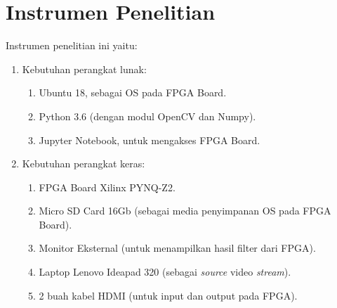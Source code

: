 \section{Instrumen Penelitian}
Instrumen penelitian ini yaitu:
\begin{enumerate}[topsep=0pt,itemsep=0pt,partopsep=0pt, parsep=0pt]
    \item Kebutuhan perangkat lunak:
    \begin{enumerate}[topsep=0pt,itemsep=0pt,partopsep=0pt, parsep=0pt, label={\alph*.}]
        \item Ubuntu 18, sebagai OS pada FPGA Board.
        \item Python 3.6 (dengan modul OpenCV dan Numpy).
        \item Jupyter Notebook, untuk mengakses FPGA Board. 
    \end{enumerate}
    \item Kebutuhan perangkat keras:
    \begin{enumerate}[topsep=0pt,itemsep=0pt,partopsep=0pt, parsep=0pt, label={\alph*.}]
        \item FPGA Board Xilinx PYNQ-Z2.
        \item Micro SD Card 16Gb (sebagai media penyimpanan OS pada FPGA Board).
        \item Monitor Eksternal (untuk menampilkan hasil filter dari FPGA).
        \item Laptop Lenovo Ideapad 320 (sebagai \textit{source} video \textit{stream}).
        \item 2 buah kabel HDMI (untuk input dan output pada FPGA). 
    \end{enumerate}
\end{enumerate}
